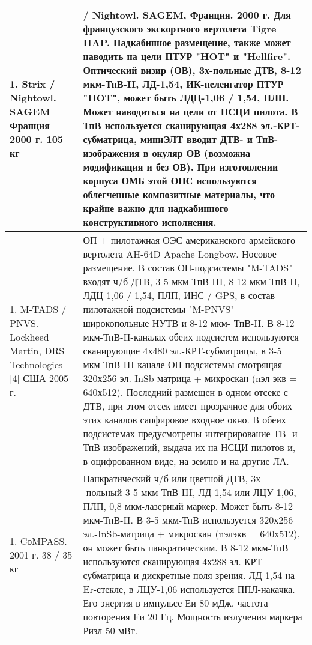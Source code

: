 \begin{landscape}
\begin{longtable}{| p{6cm} | p{18cm} |}
	\\ \hline
		1.	Strix / Nightowl. SAGEM	Франция	2000 г. 	105 кг        
	& 
		/ Nightowl. SAGEM, Франция. 2000 г. 
		Для французского экскортного вертолета Tigre HAP. Надкабинное размещение, также может наводить на цели ПТУР "HOT" и "Hellfire". 
		Оптический визир (ОВ), 3х-польные ДТВ, 8-12 мкм-ТпВ-II, ЛД-1,54, ИК-пеленгатор ПТУР "HOT", 
		может быть ЛДЦ-1,06 / 1,54, ПЛП. Может наводиться на цели от НСЦИ пилота. В ТпВ используется сканирующая 4х288 эл.-КРТ-субматрица, миниЭЛТ вводит ДТВ- и ТпВ-изображения в окуляр ОВ (возможна модификация и без ОВ). 
		При изготовлении корпуса ОМБ этой ОПС используются облегченные композитные материалы, что 
		крайне важно для надкабинного конструктивного исполнения.
		   
	\\ \hline
		1.	M-TADS / PNVS. Lockheed Martin, DRS Technologies
		[4]
		США	2005 г. 
		        
	& 
		ОП + пилотажная ОЭС американского армейского вертолета AH-64D Apache Longbow. Носовое размещение. 
		В состав ОП-подсистемы "M-TADS" входят ч/б ДТВ, 3-5 мкм-ТпВ-III, 8-12 мкм-ТпВ-II, ЛДЦ-1,06 / 
		1,54, ПЛП, ИНС / GPS, в состав пилотажной подсистемы "M-PNVS" широкопольные НУТВ и 8-12 мкм-
		ТпВ-II. 
		В 8-12 мкм-ТпВ-II-каналах обеих подсистем используются сканирующие 4х480 эл.-КРТ-субматрицы, 
		в 3-5 мкм-ТпВ-III-канале ОП-подсистемы смотрящая 320х256 эл.-InSb-матрица + микроскан (nэл
		экв
		= 
		640х512). Последний размещен в одном отсеке с ДТВ, при этом отсек имеет прозрачное для обоих этих 
		каналов сапфировое входное окно. 
		В обеих подсистемах предусмотрены интегрирование ТВ- и ТпВ-изображений, выдача их на НСЦИ 
		пилотов и, в оцифрованном виде, на землю и на другие ЛА.
		    
	\\ \hline
		1.	CоMPASS.		2001 г. 	38 / 35 кг      
& 
Панкратический ч/б или цветной ДТВ, 3х
-польный 3-5 мкм-ТпВ-III, ЛД-1,54 или ЛЦУ-1,06, ПЛП, 0,8 
мкм-лазерный маркер. Может быть 8-12 мкм-ТпВ-II. 
В 3-5 мкм-ТпВ используется 320х256 эл.-InSb-матрица + микроскан (nэлэкв = 640х512), он может быть 
панкратическим. В 8-12 мкм-ТпВ используются сканирующая 4х288 эл.-КРТ-субматрица и дискретные 
поля зрения. 
ЛД-1,54 на Er-стекле, в ЛЦУ-1,06 используется ППЛ-накачка. Его энергия в импульсе Еи 80 мДж, 
частота повторения Fи 20 Гц. Мощность излучения маркера Ризл 50 мВт. 
    

\end{longtable}
\end{landscape}
